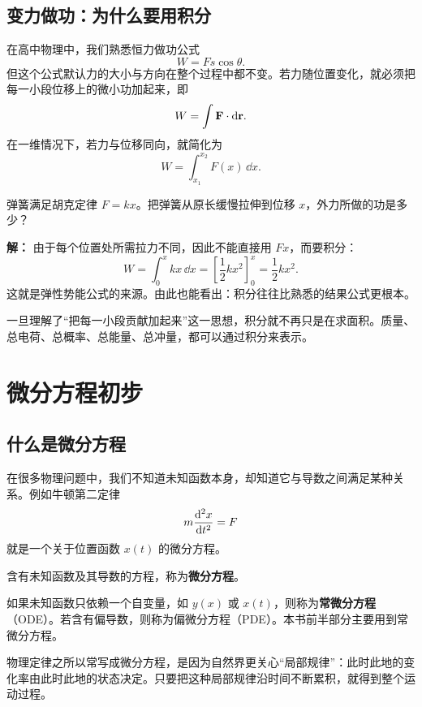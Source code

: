 \subsection{变力做功：为什么要用积分}

在高中物理中，我们熟悉恒力做功公式
\[
  W = Fs\cos\theta.
\]
但这个公式默认力的大小与方向在整个过程中都不变。若力随位置变化，就必须把每一小段位移上的微小功加起来，即
\[
  W = \int \vb{F}\cdot \dd\vb{r}.
\]
在一维情况下，若力与位移同向，就简化为
\[
  W = \int_{x_1}^{x_2} F(x)\,\dd x.
\]

\begin{example}
弹簧满足胡克定律 $F=kx$。把弹簧从原长缓慢拉伸到位移 $x$，外力所做的功是多少？

\textbf{解：} 由于每个位置处所需拉力不同，因此不能直接用 $Fx$，而要积分：
\[
  W = \int_0^x kx\,\dd x = \left[\frac12 kx^2\right]_0^x = \frac12 kx^2.
\]
这就是弹性势能公式的来源。由此也能看出：积分往往比熟悉的结果公式更根本。
\end{example}

\begin{remark}
一旦理解了“把每一小段贡献加起来”这一思想，积分就不再只是在求面积。质量、总电荷、总概率、总能量、总冲量，都可以通过积分来表示。
\end{remark}

\section{微分方程初步}

\subsection{什么是微分方程}

在很多物理问题中，我们不知道未知函数本身，却知道它与导数之间满足某种关系。例如牛顿第二定律
\[
  m\dv[2]{x}{t}=F
\]
就是一个关于位置函数 $x(t)$ 的微分方程。

\begin{definition}
含有未知函数及其导数的方程，称为\textbf{微分方程}。
\end{definition}

如果未知函数只依赖一个自变量，如 $y(x)$ 或 $x(t)$，则称为\textbf{常微分方程}（ODE）。若含有偏导数，则称为偏微分方程（PDE）。本书前半部分主要用到常微分方程。

\begin{remark}
物理定律之所以常写成微分方程，是因为自然界更关心“局部规律”：此时此地的变化率由此时此地的状态决定。只要把这种局部规律沿时间不断累积，就得到整个运动过程。
\end{remark}

